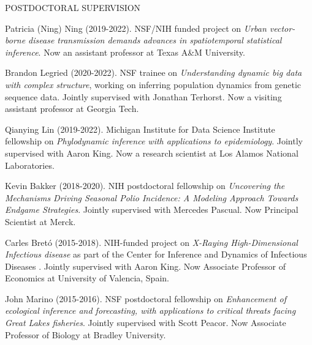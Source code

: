 \lsp

\begin{reflist}{POSTDOCTORAL SUPERVISION}

\item{Patricia (Ning) Ning } (2019-2022). NSF/NIH funded project on {\it Urban vector-borne disease transmission demands advances in spatiotemporal statistical inference}. Now an assistant professor at Texas A\&M University.

\item{Brandon Legried } (2020-2022). NSF trainee on {\it Understanding dynamic big data with complex structure}, working on inferring population dynamics from genetic sequence data. Jointly supervised with Jonathan Terhorst. Now a visiting assistant professor at Georgia Tech.
  
\item{Qianying Lin } (2019-2022). Michigan Institute for Data Science Institute fellowship on {\it Phylodynamic inference with applications to epidemiology}.  Jointly supervised with Aaron King. Now a research scientist at Los Alamos National Laboratories.
  
\item{Kevin Bakker} (2018-2020). NIH postdoctoral fellowship on {\it Uncovering the Mechanisms Driving Seasonal Polio Incidence: A Modeling Approach Towards Endgame Strategies}. Jointly supervised with Mercedes Pascual. Now Principal Scientist at Merck.

\item{Carles Bret\'{o}} (2015-2018). NIH-funded project on {\it X-Raying High-Dimensional Infectious disease} as part of the Center for Inference and Dynamics of Infectious Diseases .  Jointly supervised with Aaron King. Now Associate Professor of Economics at University of Valencia, Spain.

\item{John Marino} (2015-2016). NSF postdoctoral fellowship on {\it Enhancement of ecological inference and forecasting, with applications to critical threats facing Great Lakes fisheries}. Jointly supervised with Scott Peacor. Now Associate Professor of Biology at Bradley University.
  
\end{reflist}

\lsp

